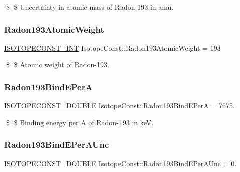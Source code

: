 \$ \$ Uncertainty in atomic mass of Radon-\/193 in amu. \mbox{\label{group___isotope_const-_radon-_rn193_ga422ad8e9bb0dd874ef5562251d9c9250}} 
\subsubsection{\texorpdfstring{Radon193\+Atomic\+Weight}{Radon193AtomicWeight}}
{\footnotesize\ttfamily \mbox{\hyperlink{group___isotope_const-_macros_ga5f18360b3e99483a35c32d789e62621c}{I\+S\+O\+T\+O\+P\+E\+C\+O\+N\+S\+T\+\_\+\+I\+NT}} Isotope\+Const\+::\+Radon193\+Atomic\+Weight = 193}

\$ \$ Atomic weight of Radon-\/193. \mbox{\label{group___isotope_const-_radon-_rn193_gae59c2c5b4ebc4e77d295edb4b268e3a5}} 
\subsubsection{\texorpdfstring{Radon193\+Bind\+E\+PerA}{Radon193BindEPerA}}
{\footnotesize\ttfamily \mbox{\hyperlink{group___isotope_const-_macros_ga8f45a7272ce02c0b4c65c44636ed719a}{I\+S\+O\+T\+O\+P\+E\+C\+O\+N\+S\+T\+\_\+\+D\+O\+U\+B\+LE}} Isotope\+Const\+::\+Radon193\+Bind\+E\+PerA = 7675.}

\$ \$ Binding energy per A of Radon-\/193 in keV. \mbox{\label{group___isotope_const-_radon-_rn193_ga3936c7c8f55a7504aae9fed770541e2a}} 
\subsubsection{\texorpdfstring{Radon193\+Bind\+E\+Per\+A\+Unc}{Radon193BindEPerAUnc}}
{\footnotesize\ttfamily \mbox{\hyperlink{group___isotope_const-_macros_ga8f45a7272ce02c0b4c65c44636ed719a}{I\+S\+O\+T\+O\+P\+E\+C\+O\+N\+S\+T\+\_\+\+D\+O\+U\+B\+LE}} Isotope\+Const\+::\+Radon193\+Bind\+E\+Per\+A\+Unc = 0.}

